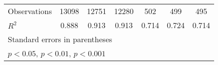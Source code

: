 {\begin{tabular}{l*{6}{c}}
\hline
Observations        &       13098         &       12751         &       12280         &         502         &         499         &         495         \\
\(R^{2}\)           &       0.888         &       0.913         &       0.913         &       0.714         &       0.724         &       0.714         \\
\hline\hline
\multicolumn{7}{l}{\footnotesize Standard errors in parentheses}\\
\multicolumn{7}{l}{\footnotesize \sym{*} \(p<0.05\), \sym{**} \(p<0.01\), \sym{***} \(p<0.001\)}\\
\end{tabular}
}

